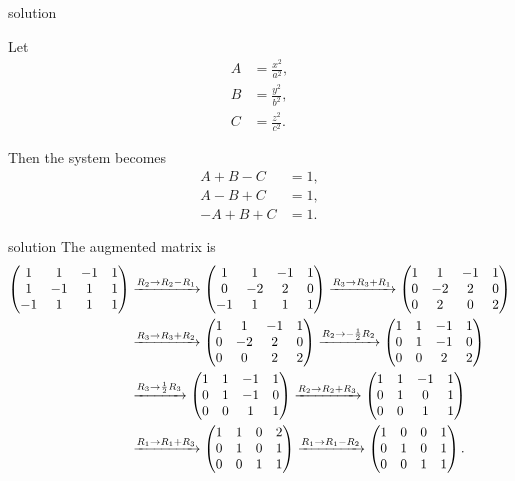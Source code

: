\documentclass{beamer}
\numberwithin{equation}{section}
\theoremstyle{remark}
\newcommand{\myvec}[1]{\ensuremath{\begin{pmatrix}#1\end{pmatrix}}}
\begin{document}
\begin{frame}{solution}

Let
\begin{align}
A &= \frac{x^2}{a^2}, \\
B &= \frac{y^2}{b^2}, \\
C &= \frac{z^2}{c^2}.
\end{align}

Then the system becomes
\begin{align}
A + B - C &= 1, \\
A - B + C &= 1, \\
- A + B + C &= 1.
\end{align}
\end{frame}
\begin{frame}{solution}
The augmented matrix is
\begin{align}
\myvec{1 & 1 & -1 & 1 \\ 1 & -1 & 1 & 1 \\ -1 & 1 & 1 & 1}
&\xrightarrow{R_2 \to R_2 - R_1}
\myvec{1 & 1 & -1 & 1 \\ 0 & -2 & 2 & 0 \\ -1 & 1 & 1 & 1}
\xrightarrow{R_3 \to R_3 + R_1}
\myvec{1 & 1 & -1 & 1 \\ 0 & -2 & 2 & 0 \\ 0 & 2 & 0 & 2} \notag\\
&\xrightarrow{R_3 \to R_3 + R_2}
\myvec{1 & 1 & -1 & 1 \\ 0 & -2 & 2 & 0 \\ 0 & 0 & 2 & 2} 
\xrightarrow{R_2 \to -\frac{1}{2} R_2} 
\myvec{1 & 1 & -1 & 1 \\ 0 & 1 & -1 & 0 \\ 0 & 0 & 2 & 2} \notag\\
&\xrightarrow{R_3 \to \frac{1}{2} R_3} 
\myvec{1 & 1 & -1 & 1 \\ 0 & 1 & -1 & 0 \\ 0 & 0 & 1 & 1} 
\xrightarrow{R_2 \to R_2 + R_3} 
\myvec{1 & 1 & -1 & 1 \\ 0 & 1 & 0 & 1 \\ 0 & 0 & 1 & 1} \notag\\
&\xrightarrow{R_1 \to R_1 + R_3} 
\myvec{1 & 1 & 0 & 2 \\ 0 & 1 & 0 & 1 \\ 0 & 0 & 1 & 1} 
\xrightarrow{R_1 \to R_1 - R_2} 
\myvec{1 & 0 & 0 & 1 \\ 0 & 1 & 0 & 1 \\ 0 & 0 & 1 & 1}.
\end{align}
\end{frame}
\end{document}
